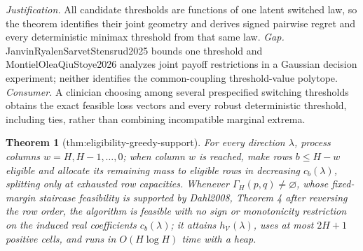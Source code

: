 \documentclass{article}
\newtheorem{theorem}{Theorem}
\begin{document}
\par\smallskip\noindent \textit{Justification.} All candidate thresholds are functions of one latent switched law, so the theorem identifies their joint geometry and derives signed pairwise regret and every deterministic minimax threshold from that same law. \textit{Gap.} JanvinRyalenSarvetStensrud2025 bounds one threshold and MontielOleaQiuStoye2026 analyzes joint payoff restrictions in a Gaussian decision experiment; neither identifies the common-coupling threshold-value polytope. \textit{Consumer.} A clinician choosing among several prespecified switching thresholds obtains the exact feasible loss vectors and every robust deterministic threshold, including ties, rather than combining incompatible marginal extrema.

\begin{theorem}[thm:eligibility-greedy-support]\label{thm:eligibility-greedy-support}
For every direction \(\lambda\), process columns \(w=H,H-1,\ldots,0\); when column \(w\) is reached, make rows \(b\le H-w\) eligible and allocate its remaining mass to eligible rows in decreasing \(c_b(\lambda)\), splitting only at exhausted row capacities. Whenever \(\Gamma_H(p,q)\ne\varnothing\), whose fixed-margin staircase feasibility is supported by Dahl2008, Theorem 4 after reversing the row order, the algorithm is feasible with no sign or monotonicity restriction on the induced real coefficients \(c_b(\lambda)\); it attains \(h_{\mathcal V}(\lambda)\), uses at most \(2H+1\) positive cells, and runs in \(O(H\log H)\) time with a heap.
\end{theorem}
\end{document}
